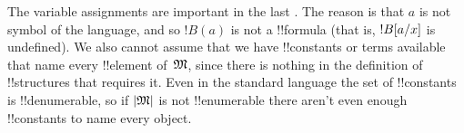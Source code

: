 \documentclass[../../../include/open-logic-section]{subfiles}
\begin{document}
\begin{explain}
The variable assignments are important in the last
.    The reason is that $a$ is not
symbol of the language, and so $!B(a)$ is not a !!{formula} (that is,
$!B[a/x]$ is undefined).  We also cannot assume that we have
!!{constant}s or terms available that name every !!{element}
of~$\Struct{M}$, since there is nothing in the definition of
!!{structure}s that requires it.  Even in the standard language the
set of !!{constant}s is !!{denumerable}, so if $\Domain{M}$ is not
!!{enumerable} there aren't even enough !!{constant}s to name every
object.
\end{explain}
\end{document}
